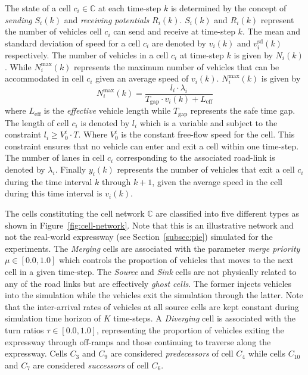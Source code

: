 \documentclass[conference]{IEEEtran}
\begin{document}
The state of a cell $c_i\in \mathbb{C}$ at each time-step $k$ is determined by the concept of {\it sending} $S_i(k)$ and {\it receiving potentials} $R_i(k)$. $S_i(k)$ and $R_i(k)$ represent the number of vehicles cell $c_i$ can send and receive at time-step $k$. The mean and standard deviation of speed for a cell $c_i$ are denoted by $v_i(k)$ and $v_i^{\text{sd}}(k)$ respectively.  The number of vehicles in a cell $c_i$ at time-step $k$ is given by $N_{i}(k)$. While $N_i^{\text{max}}(k)$ represents the maximum number of vehicles that can be accommodated in cell $c_i$ given an average speed of $v_i(k)$. $N_i^{\text{max}}(k)$ is given by
\begin{equation}
\label{eq:nmax}
N_i^{\text{max}}(k)=\frac{l_i\cdot \lambda_i}{T_{\text{gap}}\cdot v_{i}(k)+ L_{\text{eff}}}
\end{equation}
where $L_{\text{eff}}$ is the {\it effective} vehicle length while $T_{\text{gap}}$ represents the safe time gap.
The length of cell $c_i$ is denoted by $l_i$ which is a variable and subject to the constraint $l_i \ge V_0^i\cdot T$. Where $V_0^i$ is the constant free-flow speed for the cell. This constraint ensures that no vehicle can enter and exit a cell within one time-step. The number of lanes in cell $c_i$ corresponding to the associated road-link is denoted by $\lambda_i$.  Finally $y_i(k)$ represents the number of vehicles that exit a cell $c_i$ during the time interval $k$ through $k+1$, given the average speed in the cell during this time interval is $v_i(k)$.

The cells constituting the cell network $\mathbb{C}$ are classified into five different types as shown in Figure~\ref{fig:cell-network}. Note that this is an illustrative network and not the real-world expressway (see Section~\ref{subsec:pie}) simulated for the experiments. The {\it Merging} cells are associated with the parameter {\it merge priority} $\mu\in [0.0,1.0]$ which controls the proportion of vehicles that moves to the next cell in a given time-step. The {\it Source} and {\it Sink} cells are not physically related to any of the road links but are effectively {\it ghost cells}. The former injects vehicles into the simulation while the vehicles exit the simulation through the latter. Note that the inter-arrival rates of vehicles at all source cells are kept constant during simulation time horizon of $K$ time-steps. A {\it Diverging} cell is associated with the turn ratios $\tau \in [0.0,1.0]$, representing the proportion of vehicles exiting the expressway through off-ramps and those continuing to traverse along the expressway. Cells $C_3$ and $C_9$ are considered {\it predecessors} of cell $C_4$ while cells $C_{10}$ and $C_7$ are considered {\it successors} of cell $C_6$.
\end{document}

